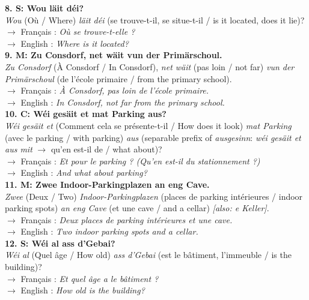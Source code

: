 \noindent\textbf{8. S: Wou läit déi?}\\
\textit{Wou} (Où / Where) \textit{läit déi} (se trouve-t-il, se situe-t-il / is it located, does it lie)?\\
$\rightarrow$ Français : \textit{Où se trouve-t-elle ?}\\
$\rightarrow$ English : \textit{Where is it located?}\\[0.5em]

\noindent\textbf{9. M: Zu Consdorf, net wäit vun der Primärschoul.}\\
\textit{Zu Consdorf} (À Consdorf / In Consdorf), \textit{net wäit} (pas loin / not far) \textit{vun der Primärschoul} (de l'école primaire / from the primary school).\\
$\rightarrow$ Français : \textit{À Consdorf, pas loin de l'école primaire.}\\
$\rightarrow$ English : \textit{In Consdorf, not far from the primary school.}\\[0.5em]

\noindent\textbf{10. C: Wéi gesäit et mat Parking aus?}\\
\textit{Wéi gesäit et} (Comment cela se présente-t-il / How does it look) \textit{mat Parking} (avec le parking / with parking) \textit{aus} (separable prefix of \textit{ausgesinn}: \textit{wéi gesäit et aus mit} $\rightarrow$ qu'en est-il de / what about)?\\
$\rightarrow$ Français : \textit{Et pour le parking ? (Qu'en est-il du stationnement ?)}\\
$\rightarrow$ English : \textit{And what about parking?}\\[0.5em]

\noindent\textbf{11. M: Zwee Indoor-Parkingplazen an eng Cave.}\\
\textit{Zwee} (Deux / Two) \textit{Indoor-Parkingplazen} (places de parking intérieures / indoor parking spots) \textit{an eng Cave} (et une cave / and a cellar) \textit{[also: e Keller]}.\\
$\rightarrow$ Français : \textit{Deux places de parking intérieures et une cave.}\\
$\rightarrow$ English : \textit{Two indoor parking spots and a cellar.}\\[0.5em]

\noindent\textbf{12. S: Wéi al ass d'Gebai?}\\
\textit{Wéi al} (Quel âge / How old) \textit{ass d'Gebai} (est le bâtiment, l'immeuble / is the building)?\\
$\rightarrow$ Français : \textit{Et quel âge a le bâtiment ?}\\
$\rightarrow$ English : \textit{How old is the building?}\\[0.5em]

